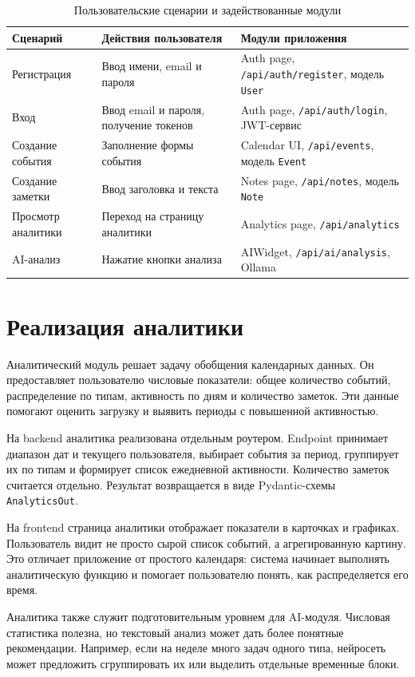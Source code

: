 \documentclass[14pt,a4paper]{extreport}
\begin{document}
\begin{longtable}{|p{}|p{}|p{}|}
\caption{Пользовательские сценарии и задействованные модули}\\
\hline
\textbf{Сценарий} & \textbf{Действия пользователя} & \textbf{Модули приложения}\\
\hline
Регистрация & Ввод имени, email и пароля & Auth page, \texttt{/api/auth/register}, модель \texttt{User}\\
\hline
Вход & Ввод email и пароля, получение токенов & Auth page, \texttt{/api/auth/login}, JWT-сервис\\
\hline
Создание события & Заполнение формы события & Calendar UI, \texttt{/api/events}, модель \texttt{Event}\\
\hline
Создание заметки & Ввод заголовка и текста & Notes page, \texttt{/api/notes}, модель \texttt{Note}\\
\hline
Просмотр аналитики & Переход на страницу аналитики & Analytics page, \texttt{/api/analytics}\\
\hline
AI-анализ & Нажатие кнопки анализа & AIWidget, \texttt{/api/ai/analysis}, Ollama\\
\hline
\end{longtable}

\section{Реализация аналитики}

Аналитический модуль решает задачу обобщения календарных данных. Он предоставляет пользователю числовые показатели: общее количество событий, распределение по типам, активность по дням и количество заметок. Эти данные помогают оценить загрузку и выявить периоды с повышенной активностью.

На backend аналитика реализована отдельным роутером. Endpoint принимает диапазон дат и текущего пользователя, выбирает события за период, группирует их по типам и формирует список ежедневной активности. Количество заметок считается отдельно. Результат возвращается в виде Pydantic-схемы \texttt{AnalyticsOut}.

На frontend страница аналитики отображает показатели в карточках и графиках. Пользователь видит не просто сырой список событий, а агрегированную картину. Это отличает приложение от простого календаря: система начинает выполнять аналитическую функцию и помогает пользователю понять, как распределяется его время.

Аналитика также служит подготовительным уровнем для AI-модуля. Числовая статистика полезна, но текстовый анализ может дать более понятные рекомендации. Например, если на неделе много задач одного типа, нейросеть может предложить сгруппировать их или выделить отдельные временные блоки.
\end{document}
